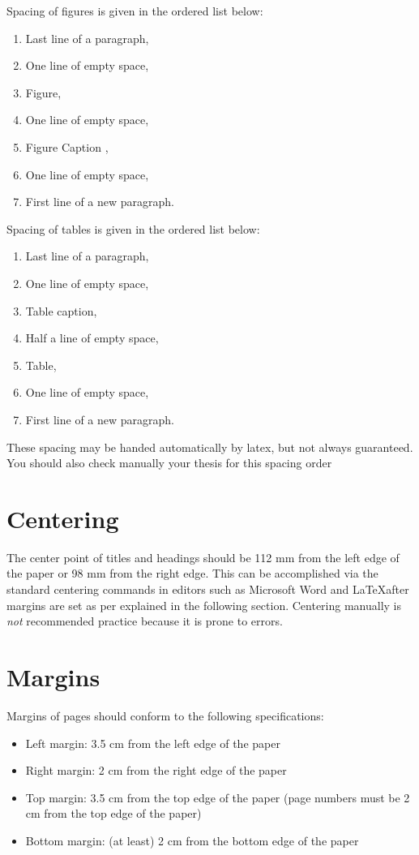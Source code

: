 \documentclass[a4paper,oneside,12pt]{report}
\numberwithin{equation}{chapter}
\begin{document}
\clearpage
Spacing of figures is given in the ordered list below:
\begin{enumerate}
 \item Last line of a paragraph,
 \item One line of empty space,
 \item Figure,
 \item One line of empty space,
 \item Figure Caption ,
 \item One line of empty space,
 \item First line of a new paragraph.
\end{enumerate}

Spacing of tables is given in the ordered list below:
\begin{enumerate}
 \item Last line of a paragraph,
 \item One line of empty space,
 \item Table caption,
 \item Half a line of empty space,
 \item Table,
 \item One line of empty space,
 \item First line of a new paragraph.
\end{enumerate}

These spacing may be handed automatically by latex, but not always guaranteed. You should also check manually your thesis for this spacing order

\section{Centering}
\label{sec:centering}

The center point of titles and headings should be 112 mm from the left
edge of the paper or 98 mm from the right edge. This can be accomplished
via the standard centering commands in editors such as Microsoft Word and \LaTeX after margins are set as per explained in the following section. Centering manually is \emph{not} recommended practice because it is prone to errors.


\section{Margins}

Margins of pages should conform to the following specifications:
\begin{itemize}
 \item Left margin: 3.5 cm from the left edge of the paper
 \item Right margin: 2 cm from the right edge of the paper
 \item Top margin: 3.5 cm from the top edge of the paper (page numbers must be 2 cm from the top edge of the paper)
 \item Bottom margin: (at least) 2 cm from the bottom edge of the paper
\end{itemize}
\end{document}
